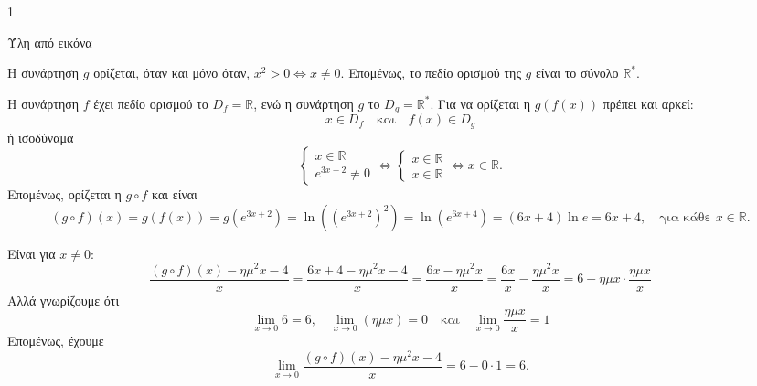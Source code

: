 \begin{ylh}{1}
    \item [Ύλη από εικόνα]
\end{ylh}

\begin{alist}
\item Η συνάρτηση $g$ ορίζεται, όταν και μόνο όταν, $x^2 > 0 \Leftrightarrow x \neq 0$.
Επομένως, το πεδίο ορισμού της $g$ είναι το σύνολο $\mathbb{R}^*$.
\item Η συνάρτηση $f$ έχει πεδίο ορισμού το $D_f = \mathbb{R}$, ενώ η συνάρτηση $g$ το $D_g = \mathbb{R}^*$.
Για να ορίζεται η $g(f(x))$ πρέπει και αρκεί:
\[ x \in D_f \quad \text{και} \quad f(x) \in D_g \]
ή ισοδύναμα
\[ \begin{cases} x \in \mathbb{R} \\ e^{3x+2} \neq 0 \end{cases} \Leftrightarrow \begin{cases} x \in \mathbb{R} \\ x \in \mathbb{R} \end{cases} \Leftrightarrow x \in \mathbb{R}. \]
Επομένως, ορίζεται η $g \circ f$ και είναι
\[ (g \circ f)(x) = g(f(x)) = g(e^{3x+2}) = \ln\left((e^{3x+2})^2\right) = \ln(e^{6x+4}) = (6x+4)\ln e = 6x + 4, \quad \text{για κάθε } x \in \mathbb{R}. \]
\item Είναι για $x \neq 0$:
\[ \frac{(g \circ f)(x) - \eta \mu^2 x - 4}{x} = \frac{6x + 4 - \eta \mu^2 x - 4}{x} = \frac{6x - \eta \mu^2 x}{x} = \frac{6x}{x} - \frac{\eta \mu^2 x}{x} = 6 - \eta \mu x \cdot \frac{\eta \mu x}{x} \]
Αλλά γνωρίζουμε ότι
\[ \lim_{x \to 0} 6 = 6, \quad \lim_{x \to 0} (\eta \mu x) = 0 \quad \text{και} \quad \lim_{x \to 0} \frac{\eta \mu x}{x} = 1 \]
Επομένως, έχουμε
\[ \lim_{x \to 0} \frac{(g \circ f)(x) - \eta \mu^2 x - 4}{x} = 6 - 0 \cdot 1 = 6. \]
\end{alist}